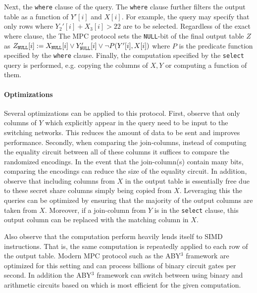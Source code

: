 Next, the \texttt{where} clause of the query. The \texttt{where} clause further filters the output table as a function of $Y'[i]$ and $X[i]$. 
\iffullversion
For example, the query may specify that only rows where $Y_2'[i] + X_3[i] > 22$  are to be selected. Regardless of the exact where clause, the 
\else 
The
\fi
MPC protocol sets the \texttt{NULL}-bit of the final output table $Z$ as $Z_\texttt{NULL}[i] :=X_\texttt{NULL}[i] \vee Y_\texttt{NULL}'[i] \vee \neg  P(Y'[i], X[i])$ where $P$ is the predicate function specified by the \texttt{where} clause.
Finally, the computation specified by the \texttt{select} query is performed, e.g. copying the columns of $X,Y$ or computing a function of them. 


\iffullversion
\paragraph{Optimizations}
Several optimizations can be applied to this protocol. First, observe that only columns of $Y$ which explicitly appear in the query need to be input to the switching networks. This reduces the amount of data to be sent and improves performance. Secondly, when comparing the join-columns, instead of computing the equality circuit between all of these columns it suffices to compare the randomized encodings. In the event that the join-column(s) contain many bits, comparing the encodings can reduce the size of the equality circuit. In addition, observe that including columns from $X$ in the output table is essentially free due to these secret share columns simply being copied from $X$. Leveraging this the queries can be optimized by ensuring that the majority of the output columns are taken from $X$. Moreover, if a join-column from $Y$ is in the \texttt{select} clause, this output column can be replaced with the matching column in $X$.

Also observe that the computation perform heavily lends itself to SIMD instructions. That is, the same computation is repeatedly applied to each row of the output table. Modern MPC protocol such as the ABY$^3$ framework \cite{aby3,highthroughput} are optimized for this setting and can process billions of binary circuit gates per second\cite{highthroughput}. In addition the ABY$^3$ framework can switch between using binary and arithmetic circuits based on which is most efficient for the given computation. 
\fi

